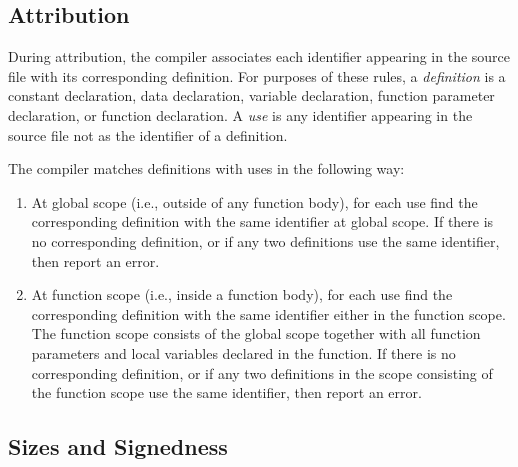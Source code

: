 \documentclass[10pt]{article}
\begin{document}
\subsection{Attribution}
\label{sec:semantics:attr}

During attribution, the compiler associates each identifier appearing
in the source file with its corresponding definition.  For purposes of
these rules, a \emph{definition} is a constant declaration, data
declaration, variable declaration, function parameter declaration, or
function declaration.  A \emph{use} is any identifier appearing in the
source file not as the identifier of a definition.

The compiler matches definitions with uses in the following way:
%
\begin{enumerate}
%
\item At global scope (i.e., outside of any function body), for each
  use find the corresponding definition with the same identifier at
  global scope.  If there is no corresponding definition, or if any
  two definitions use the same identifier, then  report an error.
%
\item At function scope (i.e., inside a function body), for each use
  find the corresponding definition with the same identifier either in
  the function scope.  The function scope consists of the global scope
  together with all function parameters and local variables declared
  in the function.  If there is no corresponding definition, or if any
  two definitions in the scope consisting of the function scope use
  the same identifier, then report an error.
%
\end{enumerate}


\subsection{Sizes and Signedness}
\end{document}

